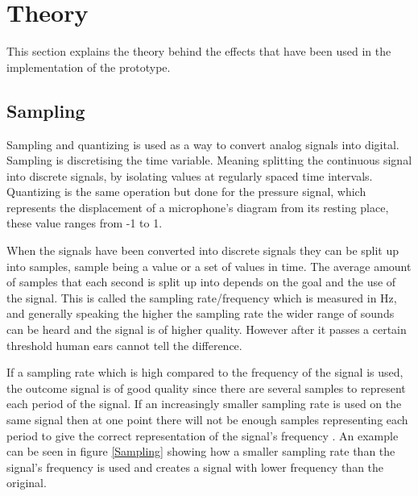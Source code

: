 \chapter{Theory}
This section explains the theory behind the effects that have been used in the implementation of the prototype. 

\section{Sampling}

Sampling and quantizing is used as a way to convert analog signals into digital. Sampling is discretising the time variable. Meaning splitting the continuous signal into discrete signals, by isolating values at regularly spaced time intervals. Quantizing is the same operation but done for the pressure signal, which represents the displacement of a microphone's diagram from its resting place, these value ranges from -1 to 1.

When the signals have been converted into discrete signals they can be split up into samples, sample being a value or  a set of values in time. The average amount of samples that each second is split up into depends on the goal and the use of the signal. This is called the sampling rate/frequency which is measured in Hz, and generally speaking the higher the sampling rate the wider range of sounds can be heard and the signal is of higher quality. However after it passes a certain threshold human ears cannot tell the difference. 

If a sampling rate which is high compared to the frequency of the signal is used, the outcome signal is of good quality  since there are several samples to represent each period of the signal. If an increasingly smaller sampling rate is used on the same signal then at one point there will not be enough samples representing each period to give the correct representation of the signal's frequency \citep{Steiglitz}. An example can be seen in figure \ref{Sampling} showing how a smaller sampling rate than the signal's frequency is used and creates a signal with lower frequency than the original.

\begin{minipage}{\linewidth}%
\label{Sampling}
\end{minipage}\\

